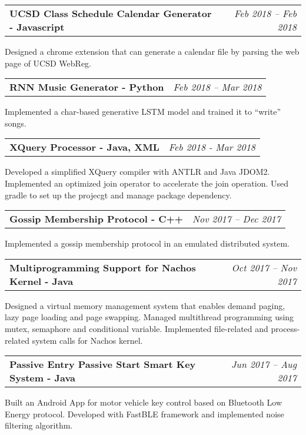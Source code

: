 \documentclass[letterpaper,11pt]{article}
\makeatletter
\newcommand{\resumeProjectHeading}[3]{
  \vspace{-3pt}\item
    \begin{tabular*}{0.97\textwidth}{l@{\extracolsep{\fill}}r}
      \textbf{#1} &  \textit{\small #2} \\
    \end{tabular*}\vspace{-1pt}
    {\begin{itemize}[leftmargin=*]
    \small{#3}
    \end{itemize}}\vspace{-5pt}
}
\makeatother
\begin{document}
    \resumeProjectHeading
       {UCSD Class Schedule Calendar Generator - Javascript}{Feb 2018 -- Feb 2018}
	   {Designed a chrome extension that can generate a calendar file by parsing the web page of UCSD WebReg. }
  
    \resumeProjectHeading
       {RNN Music Generator - Python}{Feb 2018 -- Mar 2018}
       {Implemented a char-based generative LSTM model and trained it to “write” songs.}
  
	 \resumeProjectHeading
	   {XQuery Processor - Java, XML}{Feb 2018 - Mar 2018}
	   {Developed a simplified XQuery compiler with ANTLR and Java JDOM2. Implemented an optimized join operator to accelerate the join operation. Used gradle to set up the projecgt and  manage package dependency.}
  
	 \resumeProjectHeading{Gossip Membership Protocol - C++}{Nov 2017 -- Dec 2017}
	   {Implemented a gossip membership protocol in an emulated distributed system.}
    
  
	 \resumeProjectHeading
       {Multiprogramming Support for Nachos Kernel - Java}{Oct 2017 -- Nov 2017}
       {Designed a virtual memory management system that enables demand paging, lazy page loading and page swapping.
       Managed multithread programming using mutex, semaphore and conditional variable. 
       Implemented file-related and process-related system calls for Nachos kernel.}
    
   \resumeProjectHeading
	   {Passive Entry Passive Start Smart Key System - Java}{Jun 2017 -- Aug 2017}
	   { Built an Android App for motor vehicle key control based on Bluetooth Low Energy protocol. Developed with FastBLE framework and implemented noise filtering algorithm.}
         
  
\end{document}
